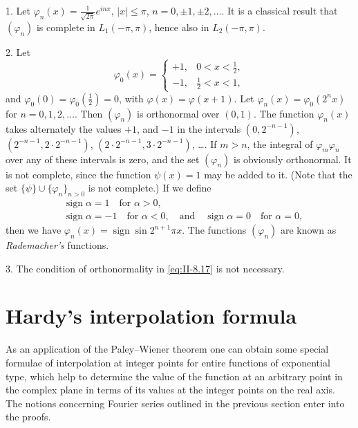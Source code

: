 \begin{remark}
1. Let $\varphi_{n}(x)=\frac{1}{\sqrt{2\pi}}e^{inx}$, $|x|\le\pi$, $n=0,\pm1,\pm2,\dots$. It is a classical result that $(\varphi_{n})$ is complete in $L_{1}(-\pi,\pi)$, hence also in $L_{2}(-\pi,\pi)$.

2. Let
\[
\varphi_{0}(x)=
\begin{cases}
+1, & 0<x<\frac{1}{2},\\
-1, & \frac{1}{2}<x<1,
\end{cases}
\]
and $\varphi_{0}(0)=\varphi_{0}(\frac{1}{2})=0$, with $\varphi(x)=\varphi(x+1)$. Let $\varphi_{n}(x)=\varphi_{0}(2^{n}x)$ for $n=0,1,2,\dots$. Then $(\varphi_{n})$ is orthonormal over $(0,1)$. The function $\varphi_{n}(x)$ takes alternately the values $+1$, and $-1$ in the intervals $(0,2^{-n-1})$, $(2^{-n-1},2\cdot2^{-n-1})$, $(2\cdot2^{-n-1},3\cdot2^{-n-1})$, \dots. If $m>n$, the integral of $\varphi_{m}\varphi_{n}$ over any of these intervals is zero, and the set $(\varphi_{n})$ is obviously orthonormal. It is not complete, since the function $\psi(x)=1$ may be added to it. (Note that the set $\{\psi\}\cup\{\varphi_{n}\}_{n>0}$ is not complete.) If we define
\[
\begin{aligned}
&\operatorname{sign}\alpha=1\quad\text{for }\alpha>0,\\
&\operatorname{sign}\alpha=-1\quad\text{for }\alpha<0,\quad\text{and}\quad \operatorname{sign}\alpha=0\quad\text{for }\alpha=0,
\end{aligned}
\]
then we have $\varphi_{n}(x)=\operatorname{sign}\sin 2^{n+1}\pi x$. The functions $(\varphi_{n})$ are known as \emph{Rademacher's} functions.

3. The condition of orthonormality in \eqref{eq:II-8.17} is not necessary.
\end{remark}

\setcounter{section}{8}
\section{Hardy's interpolation formula}
\label{sec:II-9}

As an application of the Paley--Wiener theorem one can obtain some special formulae of interpolation at integer points for entire functions of exponential type, which help to determine the value of the function at an arbitrary point in the complex plane in terms of its values at the integer points on the real axis. The notions concerning Fourier series outlined in the previous section enter into the proofs.

